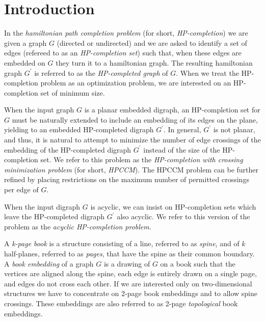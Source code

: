 \documentclass{myllncs-mixalis}
\newcommand{\eat}[1] {{}}
\begin{document}
\eat{
\textbf{TO FIX IN PAPER}
\begin{enumerate}
\item

\end{enumerate}
}





\section{Introduction}
In the \emph{hamiltonian path completion problem} (for short,
\emph{HP-completion}) we are given a graph $G$ (directed or
undirected) and we are asked to identify a set of edges (refereed to
as an \emph{HP-completion set}) such that, when these edges are
embedded on  $G$ they turn it to a hamiltonian graph. The resulting
hamiltonian graph $G^\prime$ is referred to as the
\emph{HP-completed graph} of $G$.
 When we treat the HP-completion problem as an
optimization problem, we are interested on an HP-completion set of
minimum size.

When the input graph $G$ is a planar embedded digraph, an
HP-completion set for $G$ must be naturally extended to include an
embedding of its edges on the plane, yielding to an embedded
HP-completed digraph $G^\prime$. In general, $G^\prime$ is not
planar, and thus, it is natural to attempt to minimize the number of
edge crossings of the embedding of the HP-completed digraph
$G^\prime$ instead of the size of the HP-completion set. We refer to
this problem as the \emph{HP-completion with crossing minimization
problem} (for short, \emph{HPCCM}). The HPCCM problem can be further
refined  by placing restrictions on the maximum number of permitted
crossings per edge of  $G$.

When the input digraph $G$ is acyclic, we can insist on
HP-completion sets which leave the HP-completed digraph $G^\prime$
also acyclic. We refer to this version of the problem as the
\emph{acyclic HP-completion problem}.

A \emph{k-page book} is a structure consisting of a line, referred
to as \emph{spine}, and of $k$ half-planes, referred to as
\emph{pages}, that have the spine as their common boundary. A
\emph{book embedding} of a  graph $G$ is a drawing of $G$ on a book
such that the vertices are aligned along the spine, each edge is
entirely drawn on a single page, and edges do not cross each other.
If we are interested only on two-dimensional structures we have to
concentrate on  2-page book embeddings and to allow spine crossings.
These embeddings are  also referred to as  2-page\emph{ topological
}book embeddings.
\end{document}
